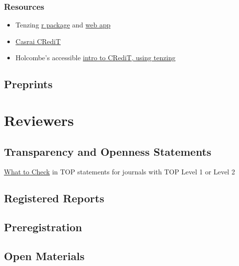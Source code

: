 \documentclass[
  oneside]{book}
\providecommand{\tightlist}{%
  \setlength{\itemsep}{0pt}\setlength{\parskip}{0pt}}
\begin{document}
\hypertarget{resources-7}{%
\section{Resources}\label{resources-7}}

\begin{itemize}
\tightlist
\item
  Tenzing \href{https://marton-balazs-kovacs.github.io/tenzing/}{r package} and \href{https://tenzing.club/}{web app}
\item
  \href{https://casrai.org/credit/}{Casrai CRediT}
\item
  Holcombe's accessible \href{https://alexholcombe.medium.com/announcing-tenzing-ceca6789d88c}{intro to CRediT, using tenzing}
\end{itemize}

\hypertarget{preprints-1}{%
\chapter{Preprints}\label{preprints-1}}

\hypertarget{part-reviewers}{%
\part{Reviewers}\label{part-reviewers}}

\hypertarget{transparency-and-openness-statements-2}{%
\chapter{Transparency and Openness Statements}\label{transparency-and-openness-statements-2}}

\href{https://www.dropbox.com/s/8jv2n0j3mlkhkrj/TOP_GuidanceforReviewers.docx}{What to Check} in TOP statements for journals with TOP Level 1 or Level 2

\hypertarget{registered-reports-2}{%
\chapter{Registered Reports}\label{registered-reports-2}}

\hypertarget{preregistration-2}{%
\chapter{Preregistration}\label{preregistration-2}}

\hypertarget{open-materials-2}{%
\chapter{Open Materials}\label{open-materials-2}}
\end{document}
